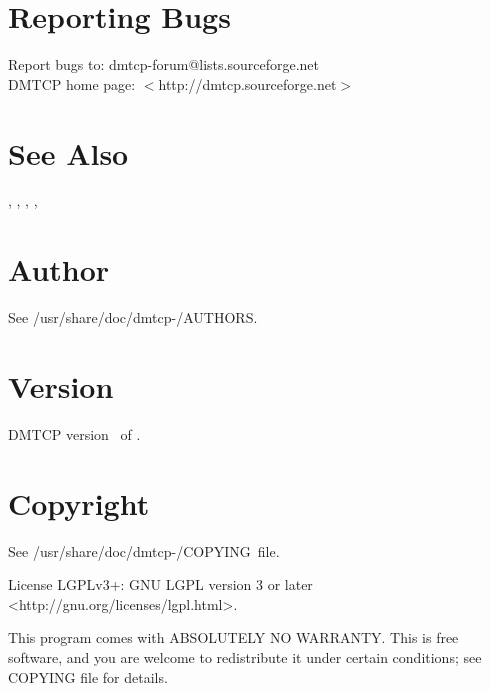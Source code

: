\section{Reporting Bugs}
Report bugs to: dmtcp-forum@lists.sourceforge.net\\
DMTCP home page: $<$http://dmtcp.sourceforge.net$>$

\section{See Also}
, , ,
, 

\section{Author}
See /usr/share/doc/dmtcp-\Version/AUTHORS.

\section{Version}

DMTCP version \Version\ of \Date.

\section{Copyright}
See /usr/share/doc/dmtcp-\Version/COPYING~file.

License LGPLv3+: GNU LGPL version 3 or later <http://gnu.org/licenses/lgpl.html>.

This program comes with ABSOLUTELY NO WARRANTY.
This is free software, and you are welcome to redistribute it under certain
conditions; see COPYING file for details.


